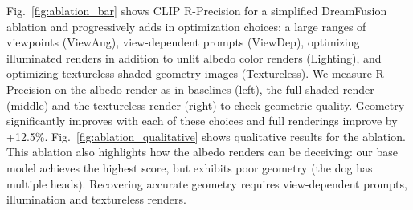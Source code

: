 \documentclass{article} %
\newcommand{\dreamfusion}{DreamFusion\xspace}
\begin{document}
 Fig.~\ref{fig:ablation_bar} shows CLIP R-Precision for a simplified \dreamfusion ablation and progressively adds in optimization choices: a large ranges of viewpoints (ViewAug), view-dependent prompts (ViewDep), optimizing illuminated renders in addition to unlit albedo color renders (Lighting), and optimizing textureless shaded geometry images (Textureless). We measure R-Precision on the albedo render as in baselines (left), the full shaded render (middle) and the textureless render (right) to check geometric quality. Geometry significantly improves with each of these choices and full renderings improve by +12.5\%. Fig.~\ref{fig:ablation_qualitative} shows qualitative results for the ablation. This ablation also highlights how the albedo renders can be deceiving: our base model achieves the highest score, but exhibits poor geometry (the dog has multiple heads). Recovering accurate geometry requires view-dependent prompts, illumination and textureless renders.
\end{document}
